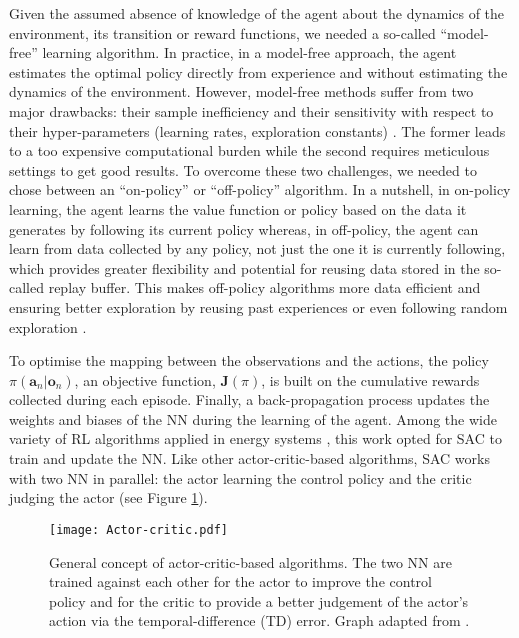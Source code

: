 Given the assumed absence of knowledge of the agent about the dynamics of the environment, \ie its transition or reward functions, we needed a so-called ``model-free'' learning algorithm. In practice, in a model-free approach, the agent estimates the optimal policy directly from experience and without estimating the dynamics of the environment. However, model-free methods suffer from two major drawbacks: their sample inefficiency and their sensitivity with respect to their hyper-parameters (\eg learning rates, exploration constants) \cite{haarnoja2018soft}. The former leads to a too expensive computational burden while the second requires meticulous settings to get good results.  To overcome these two challenges, we needed to chose between an ``on-policy'' or ``off-policy'' algorithm. In a nutshell, in on-policy learning, the agent learns the value function or policy based on the data it generates by following its current policy whereas, in off-policy, the agent can learn from data collected by any policy, not just the one it is currently following, which provides greater flexibility and potential for reusing data stored in the so-called replay buffer. This makes off-policy algorithms more data efficient and ensuring better exploration by reusing past experiences or even following random exploration \cite{haarnoja2018soft}.

To optimise the mapping between the observations and the actions, the policy $\pi\left(\bm{a}_n | \bm{o}_n\right)$, an objective function, $\bm{J}(\pi)$, is built on the cumulative rewards collected during each episode. Finally, a back-propagation process updates the weights and biases of the \gls{NN} during the learning of the agent. Among the wide variety of \gls{RL} algorithms applied in energy systems \cite{perera2021applications}, this work opted for \gls{SAC} \cite{haarnoja2018soft} to train and update the \gls{NN}.  Like other actor-critic-based algorithms, \gls{SAC} works with two \gls{NN} in parallel: the actor learning the control policy and the critic judging the actor (see Figure \ref{fig:Actor-critic}).

\begin{figure}[!htbp]
\centering
\texttt{[image: Actor-critic.pdf]}
\caption{General concept of actor-critic-based algorithms. The two \gls{NN} are trained against each other for the actor to improve the control policy and for the critic to provide a better judgement of the actor's action via the temporal-difference (TD) error. Graph adapted from \cite{cao2020reinforcement}.}
\label{fig:Actor-critic}
\end{figure}


